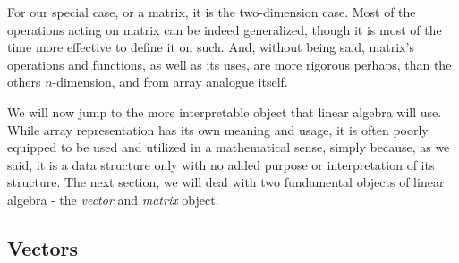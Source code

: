 \begin{center}
\end{center}
For our special case, or a matrix, it is the two-dimension case. Most of the operations acting on matrix can be indeed generalized, though it is most of the time more effective to define it on such. And, without being said, matrix's operations and functions, as well as its uses, are more rigorous perhaps, than the others $n$-dimension, and from array analogue itself. 

We will now jump to the more interpretable object that linear algebra will use. While array representation has its own meaning and usage, it is often poorly equipped to be used and utilized in a mathematical sense, simply because, as we said, it is a data structure only with no added purpose or interpretation of its structure. The next section, we will deal with two fundamental objects of linear algebra - the \textit{vector} and \textit{matrix} object.

\subsection{Vectors}

